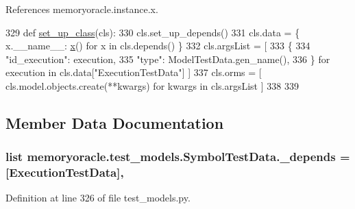 References memoryoracle.\+instance.\+x.


\begin{DoxyCode}
329     \textcolor{keyword}{def }\hyperlink{classmemoryoracle_1_1test__models_1_1SymbolTestData_afca33665e3d8a725b1a17fa0fbbcb062}{set\_up\_class}(cls):
330         cls.set\_up\_depends()
331         cls.data = \{ x.\_\_name\_\_: \hyperlink{namespacememoryoracle_1_1instance_afe036cc8dc71469743d090c4c80d50c5}{x}() \textcolor{keywordflow}{for} x \textcolor{keywordflow}{in} cls.depends() \}
332         cls.argsList = [
333                 \{
334                     \textcolor{stringliteral}{"id\_execution"}: execution,
335                     \textcolor{stringliteral}{"type"}: ModelTestData.gen\_name(),
336                 \} \textcolor{keywordflow}{for} execution \textcolor{keywordflow}{in} cls.data[\textcolor{stringliteral}{"ExecutionTestData"}] ]
337         cls.orms = [ cls.model.objects.create(**kwargs) \textcolor{keywordflow}{for} kwargs \textcolor{keywordflow}{in} cls.argsList ]
338 
339 
\end{DoxyCode}


\subsection{Member Data Documentation}
\hypertarget{classmemoryoracle_1_1test__models_1_1SymbolTestData_a8e976ca1ae5df89e1717aa691f241f8c}{}
\subsubsection[{\+\_\+depends}]{\setlength{\rightskip}{0pt plus 5cm}list memoryoracle.\+test\+\_\+models.\+Symbol\+Test\+Data.\+\_\+depends = \mbox{[}{\bf Execution\+Test\+Data}\mbox{]}\hspace{0.3cm}{\ttfamily [static]}, {\ttfamily [private]}}\label{classmemoryoracle_1_1test__models_1_1SymbolTestData_a8e976ca1ae5df89e1717aa691f241f8c}


Definition at line 326 of file test\+\_\+models.\+py.

\hypertarget{classmemoryoracle_1_1test__models_1_1SymbolTestData_a826f1c1d428e181ce79166814bf29c79}{}
